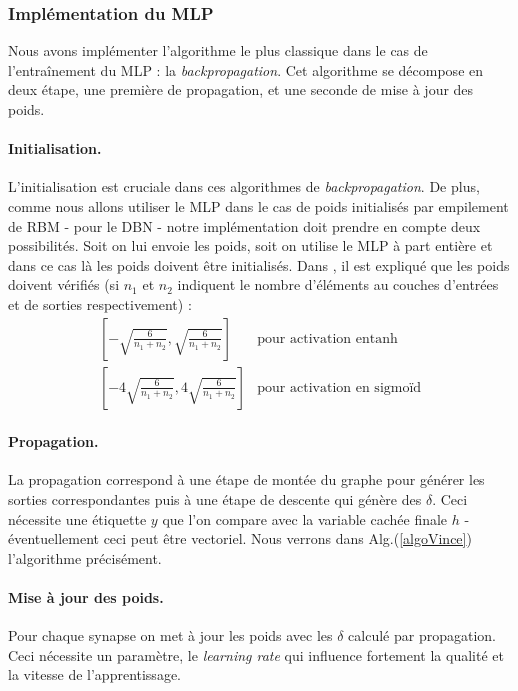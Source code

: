 \documentclass[10pt,a4paper]{article}
\begin{document}


\subsubsection{Implémentation du MLP}

Nous avons implémenter l'algorithme le plus classique dans le cas de l'entraînement du MLP : la \emph{backpropagation}. Cet algorithme se décompose en deux étape, une première de propagation, et une seconde de mise à jour des poids. 

\paragraph{Initialisation. }L'initialisation est cruciale dans ces algorithmes de \emph{backpropagation}. De plus, comme nous allons utiliser le MLP dans le cas de poids initialisés par empilement de RBM - pour le DBN - notre implémentation doit prendre en compte deux possibilités. Soit on lui envoie les poids, soit on utilise le MLP à part entière et dans ce cas là les poids doivent être initialisés. Dans \cite{GlorotAISTATS2010}, il est expliqué que les poids doivent vérifiés (si $n_1$ et $ n_2$ indiquent le nombre d'éléments au couches d'entrées et de sorties respectivement) : 
\begin{equation}
\begin{array}{ll}
\displaystyle \left[ - \sqrt{\frac{6}{n_1+n_2}} , \sqrt{\frac{6}{n_1+n_2}}\right] & \text{pour activation en} \tanh \\
\displaystyle \left[ - 4\sqrt{\frac{6}{n_1+n_2}} , 4\sqrt{\frac{6}{n_1+n_2}}\right] & \text{pour activation en sigmoïd} 
\end{array}
\end{equation}


\paragraph{Propagation. }La propagation correspond à une étape de montée du graphe pour générer les sorties correspondantes puis à une étape de descente qui génère des $\delta$. Ceci nécessite une étiquette $y$ que l'on compare avec la variable cachée finale $h$ - éventuellement ceci peut être vectoriel. Nous verrons dans Alg.(\ref{algoVince}) l'algorithme précisément. 

\paragraph{Mise à jour des poids. }Pour chaque synapse on met à jour les poids avec les $\delta$ calculé par propagation. Ceci nécessite un paramètre, le \emph{learning rate} qui influence fortement la qualité et la vitesse de l'apprentissage. \\
\end{document}
